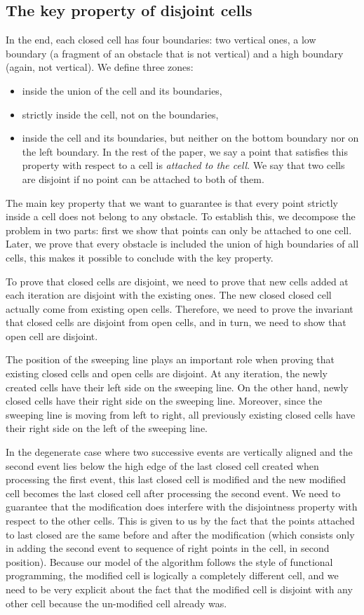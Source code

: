 \documentclass[a4paper, USenglish, cleveref, autoref, thm-restate]{lipics-v2021}
\begin{document}
\subsection{The key property of disjoint cells}
In the end, each closed cell has four boundaries: two vertical ones, a
low boundary (a fragment of an obstacle that is not vertical) and a
high boundary (again, not vertical).  We define three zones:
\begin{itemize}
\item inside the union of the cell and its boundaries,
\item strictly inside the cell, not on the boundaries,
\item inside the cell and its
 boundaries, but neither on the bottom boundary nor on the left
 boundary.  In the rest of the paper, we say a point that satisfies
 this property with respect to a cell is {\em attached to the cell}.
 We say that two cells are disjoint if no point can be attached to
 both of them.
\end{itemize}
The main key property that we want to guarantee is that every point
strictly inside a cell does not belong to any obstacle.  To establish
this, we decompose the problem in two parts: first we show
that points can only be attached to one cell.  Later, we
prove that every obstacle is included the union of high boundaries of
all cells, this makes it possible to conclude with the key property.

To prove that closed cells are disjoint, we need to prove that new
cells added at each iteration are disjoint with the existing ones.
The new closed closed cell actually come from
existing open cells.  Therefore, we need to prove the invariant that
closed cells are disjoint from open cells, and in turn, we need to
show that open cell are disjoint.

The position of the sweeping line plays an important role when proving
that existing closed cells and open cells are disjoint.  At any
iteration, the newly created cells have their left side on the
sweeping line.  On the other hand, newly closed cells have their right
side on the sweeping line.  Moreover, since the sweeping line is moving
from left to right, all previously existing closed cells have their
right side on the left of the sweeping line.

In the degenerate case where two successive events are vertically
aligned and the second event lies below the high edge of the last
closed cell created when processing the first event, this last closed
cell is modified and the new modified cell becomes the last closed
cell after processing the second event.  We need to guarantee that
the modification does interfere with the disjointness property with
respect to the other cells.  This is given to us by the fact that the
points attached to last closed are the same before and after the
modification (which consists only in adding the second event to
sequence of right points in the cell, in second position).  Because
our model of the algorithm follows the style of functional
programming, the modified cell is logically a completely different cell,
and we need to be very explicit about the fact that the modified cell
is disjoint with any other cell because the un-modified cell already
was.
\end{document}
